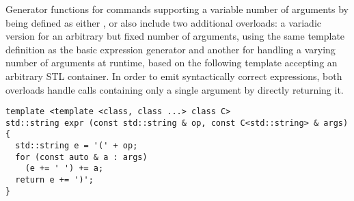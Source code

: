 \noindent
Generator functions for {\SMTLIB} commands supporting a variable number of arguments by being defined as either ,  or  %
also include two additional overloads:
a variadic version for an arbitrary but fixed number of arguments, using the same template definition as the basic expression generator 
and another for handling a varying number of arguments at runtime, based on the following template accepting an arbitrary STL container.
In order to emit syntactically correct {\SMTLIB} expressions, both overloads handle calls containing only a single argument by directly returning it.



\newpage

\begin{lstlisting}[style=c++]
template <template <class, class ...> class C>
std::string expr (const std::string & op, const C<std::string> & args)
{
  std::string e = '(' + op;
  for (const auto & a : args)
    (e += ' ') += a;
  return e += ')';
}
\end{lstlisting}

